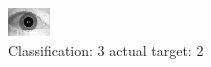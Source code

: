 \begin{figure}[h!]
\begin{center}
\includegraphics[width=0.60\columnwidth]{figures/ID1773_class_3_target_2.png}
\end{center}
\caption{ Classification: 3 actual target: 2}
\label{fig:ID1773_class_3_target_2}
\end{figure}
